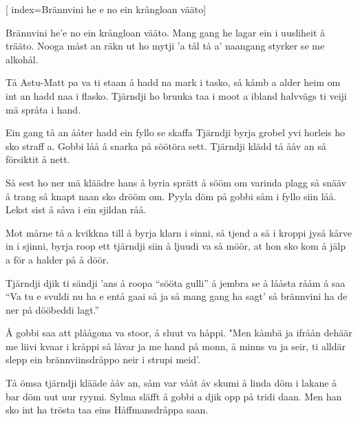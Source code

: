 

[					%
	index={Brännvini he e no ein krångloan vääto}]						%
	

\beginverse*						%
Brännvini he'e no ein krångloan vääto.
Mang gang he lagar ein i uusliheit å trääto.
Nooga måst an räkn ut ho mytji 'a tål
tå a' naangang styrker se me alkohål.
\endverse							%

\beginverse*						%
Tå Astu-Matt pa va ti staan å hadd na mark i tasko,
så kåmb a alder heim om int an hadd naa i flasko.
Tjärndji ho bruuka taa i moot a ibland
halvvägs ti veiji mä språta i hand.
\endverse							%

\beginverse*						%
Ein gang tå an ååter hadd ein fyllo se skaffa
Tjärndji byrja grobel yvi horleis ho sko straff a.
Gobbi låå å snarka på söötöra sett.
Tjärndji klädd tå ååv an så försiktit å nett.
\endverse							%

\beginverse*						%
Så sest ho ner mä kläädre hans å byria sprätt å sööm om
varinda plagg så snääv å trang så knapt naan sko
drööm om.
Pyyla döm på gobbi såm i fyllo siin låå.
Lekst sist å såva i ein sjildan råå.
\endverse							%

\beginverse*						%
Mot mårne tå a kvikkna till å byrja klarn i sinni,
så tjend a så i kroppi jyså kårve in i sjinni,
byrja roop ett tjärndji siin å ljuudi va så möör,
at hon sko kom å jälp a för a halder på å döör.
\endverse							%

\beginverse*						%
Tjärndji djik ti sändji 'ans å roopa ``sööta gulli''
å jembra se å lååsta rååm å saa ``Va tu e svuldi
nu ha e entå gaai så ja så mang gang ha sagt'
så brännvini ha de ner på dööbeddi lagt.''
\endverse							%

\beginverse*						%
Å gobbi saa att plåågona va stoor, å sluut va håppi.
"Men kåmbä ja ifråån dehäär me liivi kvaar i kråppi
så låvar ja me hand på monn, å minns va ja seir,
ti alldär slepp ein brännviinsdråppo neir i strupi meid'.
\endverse							%

\beginverse*						%
Tå ömsa tjärndji klääde ååv an, såm var vååt åv skumi
å linda döm i lakane å bar döm uut uur ryymi.
Sylma släfft å gobbi a djik opp på tridi daan.
Men han sko int ha trösta taa eins Håffmansdråppa
saan.
\endverse							%

\endsong							%